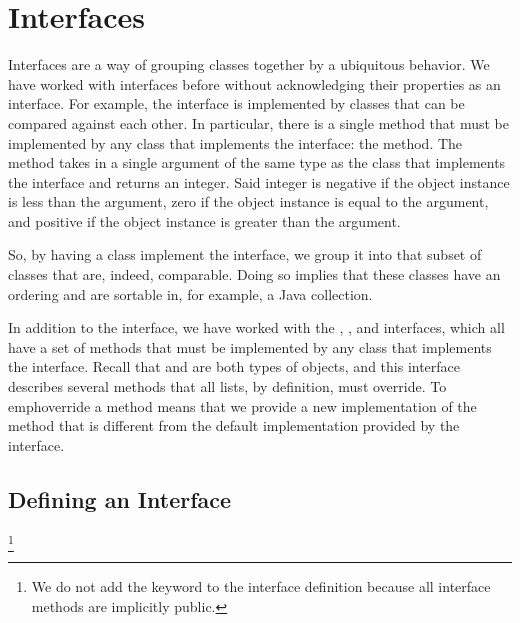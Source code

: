 \section{Interfaces}

Interfaces are a way of grouping classes together by a ubiquitous behavior. We have worked with interfaces before without acknowledging their properties as an interface. For example, the  interface is implemented by classes that can be compared against each other. In particular, there is a single method that must be implemented by any class that implements the  interface: the  method. The  method takes in a single argument of the same type as the class that implements the  interface and returns an integer. Said integer is negative if the object instance is less than the argument, zero if the object instance is equal to the argument, and positive if the object instance is greater than the argument.

So, by having a class implement the  interface, we group it into that subset of classes that are, indeed, comparable. Doing so implies that these classes have an ordering and are sortable in, for example, a Java collection. 

In addition to the  interface, we have worked with the , , and  interfaces, which all have a set of methods that must be implemented by any class that implements the interface. Recall that  and  are both types of  objects, and this interface describes several methods that all lists, by definition, must override. To emph{override} a method means that we provide a new implementation of the method that is different from the default implementation provided by the interface.

\subsection{Defining an Interface}

\footnote{We do not add the  keyword to the interface definition because all interface methods are implicitly public.}


